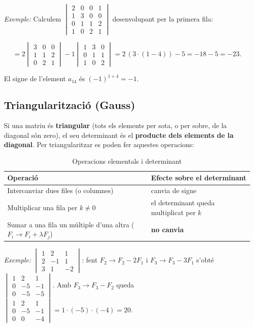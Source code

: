 \emph{Exemple:} Calculem $\begin{vmatrix}2&0&0&1\\1&3&0&0\\0&1&1&2\\1&0&2&1\end{vmatrix}$ desenvolupant per la primera fila:

\begin{equation*}
=2\begin{vmatrix}3&0&0\\1&1&2\\0&2&1\end{vmatrix}-1\begin{vmatrix}1&3&0\\0&1&1\\1&0&2\end{vmatrix}=2\,(3\cdot(1-4))-5=-18-5=-23.
\end{equation*}

El signe de l'element $a_{14}$ és $(-1)^{1+4}=-1$.

\subsection{Triangularització (Gauss)}

Si una matriu és \textbf{triangular} (tots els elements per sota, o per sobre, de la diagonal són zero), el seu determinant és el \textbf{producte dels elements de la diagonal}. Per triangularitzar es poden fer aquestes operacions:

\begin{table}[!htbp]
\centering
\renewcommand{\arraystretch}{1.3}
\begin{tabularx}{\textwidth}{>{\raggedright\arraybackslash}X>{\raggedright\arraybackslash}X}
\toprule
Operació & Efecte sobre el determinant \\
\midrule
Intercanviar dues files (o columnes) & canvia de signe \\
Multiplicar una fila per $k\neq0$ & el determinant queda multiplicat per $k$ \\
Sumar a una fila un múltiple d'una altra ($F_i\to F_i+\lambda F_j$) & \textbf{no canvia} \\
\bottomrule
\end{tabularx}
\caption{Operacions elementals i determinant}
\end{table}

\emph{Exemple:} $\begin{vmatrix}1&2&1\\2&-1&1\\3&1&-2\end{vmatrix}$: fent $F_2\to F_2-2F_1$ i $F_3\to F_3-3F_1$ s'obté $\begin{vmatrix}1&2&1\\0&-5&-1\\0&-5&-5\end{vmatrix}$. Amb $F_3\to F_3-F_2$ queda $\begin{vmatrix}1&2&1\\0&-5&-1\\0&0&-4\end{vmatrix}=1\cdot(-5)\cdot(-4)=20$.

